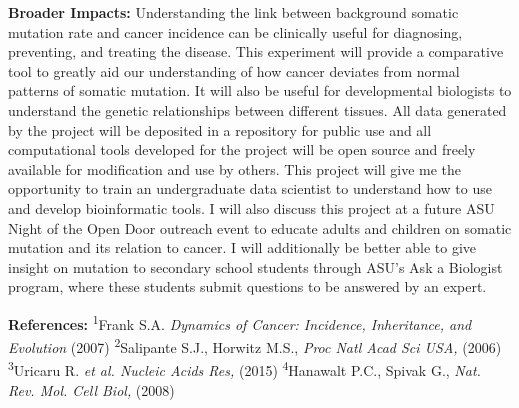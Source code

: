 \documentclass[12pt]{article}
\begin{document}
\textbf{Broader Impacts:}
Understanding the link between background somatic mutation rate and cancer incidence can be clinically useful for diagnosing, preventing, and treating the disease.
This experiment will provide a comparative tool to greatly aid our understanding of how cancer deviates from normal patterns of somatic mutation.
It will also be useful for developmental biologists to understand the genetic relationships between different tissues.
All data generated by the project will be deposited in a repository for public use and all computational tools developed for the project will be open source and freely available for modification and use by others.
This project will give me the opportunity to train an undergraduate data scientist to understand how to use and develop bioinformatic tools.
I will also discuss this project at a future ASU Night of the Open Door outreach event to educate adults and children on somatic mutation and its relation to cancer.
I will additionally be better able to give insight on mutation to secondary school students through ASU's Ask a Biologist program, where these students submit questions to be answered by an expert.

\begin{footnotesize}
\textbf{References:}
\textsuperscript{1}Frank S.A. \textit{Dynamics of Cancer: Incidence, Inheritance, and Evolution} (2007)
\textsuperscript{2}Salipante S.J., Horwitz M.S., \textit{Proc Natl Acad Sci USA,} (2006)
\textsuperscript{3}Uricaru R. \textit{et al. Nucleic Acids Res,} (2015)
\textsuperscript{4}Hanawalt P.C., Spivak G., \textit{Nat. Rev. Mol. Cell Biol,} (2008)

\end{footnotesize}
\end{document}
